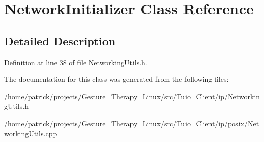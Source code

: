 \hypertarget{class_network_initializer}{}\section{Network\+Initializer Class Reference}
\label{class_network_initializer}


\subsection{Detailed Description}


Definition at line 38 of file Networking\+Utils.\+h.



The documentation for this class was generated from the following files\+:\begin{DoxyCompactItemize}
\item 
/home/patrick/projects/\+Gesture\+\_\+\+Therapy\+\_\+\+Linux/src/\+Tuio\+\_\+\+Client/ip/Networking\+Utils.\+h\item 
/home/patrick/projects/\+Gesture\+\_\+\+Therapy\+\_\+\+Linux/src/\+Tuio\+\_\+\+Client/ip/posix/Networking\+Utils.\+cpp\end{DoxyCompactItemize}
